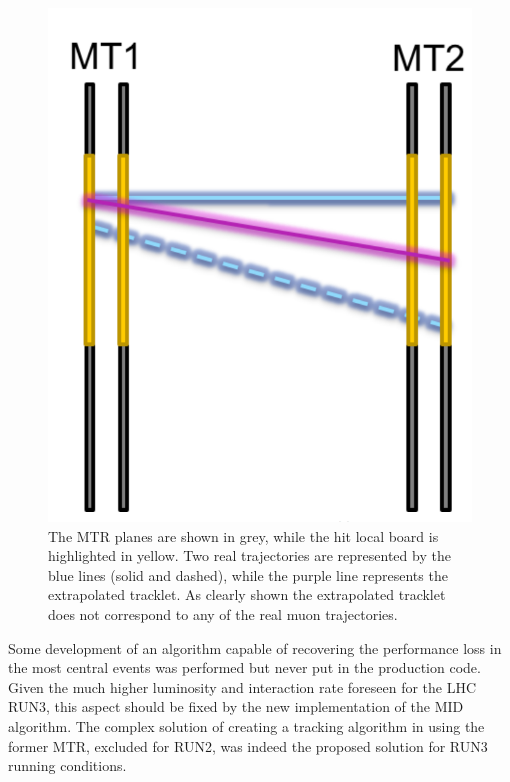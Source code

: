 \begin{figure}[!t]
\begin{center}
\includegraphics[width=0.5\linewidth]{Chapters/O2/Figs/MTR_old.png}
\caption{The MTR planes are shown in grey, while the hit local board is highlighted in yellow. Two real trajectories are represented by the blue lines (solid and dashed), while the purple line represents the extrapolated tracklet. As clearly shown the extrapolated tracklet does not correspond to any of the real muon trajectories.}
\label{fig:MTR_loss}
\end{center}
\end{figure}

Some development of an algorithm capable of recovering the performance loss in the most central events was performed but never put in the production code.
Given the much higher luminosity and interaction rate foreseen for the LHC RUN3, this aspect should be fixed by the new implementation of the MID algorithm.
The complex solution of creating a tracking algorithm in using the former MTR, excluded for RUN2, was indeed the proposed solution for RUN3 running conditions.

